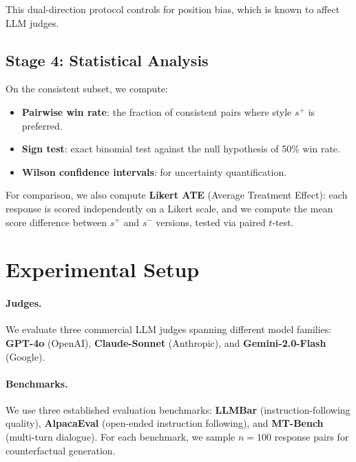\documentclass[11pt,a4paper]{article}
\begin{document}
This dual-direction protocol controls for position bias, which is known to affect LLM judges.

\subsection{Stage 4: Statistical Analysis}

On the consistent subset, we compute:
\begin{itemize}
    \item \textbf{Pairwise win rate}: the fraction of consistent pairs where style $s^+$ is preferred.
    \item \textbf{Sign test}: exact binomial test against the null hypothesis of 50\% win rate.
    \item \textbf{Wilson confidence intervals}: for uncertainty quantification.
\end{itemize}

For comparison, we also compute \textbf{Likert ATE} (Average Treatment Effect): each response is scored independently on a Likert scale, and we compute the mean score difference between $s^+$ and $s^-$ versions, tested via paired $t$-test.

\section{Experimental Setup}

\paragraph{Judges.}
We evaluate three commercial LLM judges spanning different model families: \textbf{GPT-4o} (OpenAI), \textbf{Claude-Sonnet} (Anthropic), and \textbf{Gemini-2.0-Flash} (Google).

\paragraph{Benchmarks.}
We use three established evaluation benchmarks: \textbf{LLMBar} (instruction-following quality), \textbf{AlpacaEval} (open-ended instruction following), and \textbf{MT-Bench} (multi-turn dialogue).
For each benchmark, we sample $n=100$ response pairs for counterfactual generation.
\end{document}
